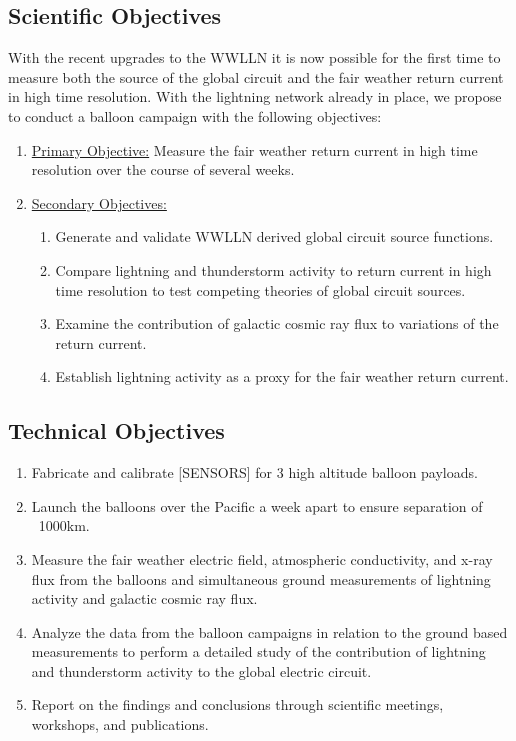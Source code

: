 \documentclass[12pt, letterpaper, onecolumn, oneside]{article}
\begin{document}
\subsection*{Scientific Objectives}

With the recent upgrades to the WWLLN it is now possible for the first time to measure both the source of the global circuit and the fair weather return current in high time resolution. With the lightning network already in place, we propose to conduct a balloon campaign with the following objectives:

\begin{enumerate}
\item{\underline{Primary Objective:} Measure the fair weather return current in high time resolution over the course of several weeks.}
\item{\underline{Secondary Objectives:}
\begin{enumerate}
\item{Generate and validate WWLLN derived global circuit source functions.}
\item{Compare lightning and thunderstorm activity to return current in high time resolution to test competing theories of global circuit sources.}
\item{Examine the contribution of galactic cosmic ray flux to variations of the return current.}
\item{Establish lightning activity as a proxy for the fair weather return current.}
\end{enumerate}}
\end{enumerate}

\subsection*{Technical Objectives}

\begin{enumerate}
\item{Fabricate and calibrate [SENSORS] for 3 high altitude balloon payloads.}
\item{Launch the balloons over the Pacific a week apart to ensure separation of ~1000km.}
\item{Measure the fair weather electric field, atmospheric conductivity, and x-ray flux from the balloons and simultaneous ground measurements of lightning activity and galactic cosmic ray flux.}
\item{Analyze the data from the balloon campaigns in relation to the ground based measurements to perform a detailed study of the contribution of lightning and thunderstorm activity to the global electric circuit.}
\item{Report on the findings and conclusions through scientific meetings, workshops, and publications.}
\end{enumerate}
\end{document}
